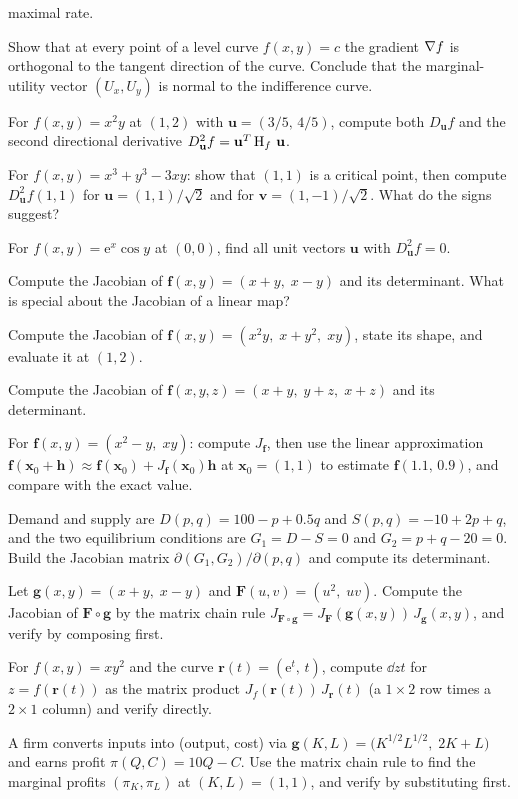 \begin{problems}
        maximal rate.
  \item Show that at every point of a level curve $f(x,y)=c$ the gradient
        $\nabla f$ is orthogonal to the tangent direction of the curve.
        Conclude that the marginal-utility vector $(U_{x},U_{y})$ is
        normal to the indifference curve.
  \item For $f(x,y)=x^{2}y$ at $(1,2)$ with $\mathbf{u}=(3/5,\,4/5)$,
        compute both $D_{\mathbf{u}}f$ and the second directional
        derivative
        $D^{2}_{\mathbf{u}}f=\mathbf{u}^{T}\operatorname{H}_{f}\,\mathbf{u}$.
  \item For $f(x,y)=x^{3}+y^{3}-3xy$: show that $(1,1)$ is a critical
        point, then compute $D^{2}_{\mathbf{u}}f(1,1)$ for
        $\mathbf{u}=(1,1)/\sqrt{2}$ and for
        $\mathbf{v}=(1,-1)/\sqrt{2}$. What do the signs suggest?
  \item For $f(x,y)=\mathrm{e}^{x}\cos y$ at $(0,0)$, find all unit
        vectors $\mathbf{u}$ with $D^{2}_{\mathbf{u}}f=0$.
  \item Compute the Jacobian of $\mathbf{f}(x,y)=(x+y,\;x-y)$ and its
        determinant. What is special about the Jacobian of a linear map?
  \item Compute the Jacobian of
        $\mathbf{f}(x,y)=(x^{2}y,\;x+y^{2},\;xy)$, state its shape, and
        evaluate it at $(1,2)$.
  \item Compute the Jacobian of
        $\mathbf{f}(x,y,z)=(x+y,\;y+z,\;x+z)$ and its determinant.
  \item For $\mathbf{f}(x,y)=(x^{2}-y,\;xy)$: compute $J_{\mathbf{f}}$,
        then use the linear approximation
        $\mathbf{f}(\mathbf{x}_{0}+\mathbf{h})\approx
        \mathbf{f}(\mathbf{x}_{0})+J_{\mathbf{f}}(\mathbf{x}_{0})\mathbf{h}$
        at $\mathbf{x}_{0}=(1,1)$ to estimate $\mathbf{f}(1.1,\,0.9)$,
        and compare with the exact value.
  \item Demand and supply are $D(p,q)=100-p+0.5q$ and
        $S(p,q)=-10+2p+q$, and the two equilibrium conditions are
        $G_{1}=D-S=0$ and $G_{2}=p+q-20=0$. Build the Jacobian matrix
        $\partial(G_{1},G_{2})/\partial(p,q)$ and compute its
        determinant.
  \item Let $\mathbf{g}(x,y)=(x+y,\;x-y)$ and
        $\mathbf{F}(u,v)=(u^{2},\;uv)$. Compute the Jacobian of
        $\mathbf{F}\circ\mathbf{g}$ by the matrix chain rule
        $J_{\mathbf{F}\circ\mathbf{g}}
        =J_{\mathbf{F}}(\mathbf{g}(x,y))\,J_{\mathbf{g}}(x,y)$, and
        verify by composing first.
  \item For $f(x,y)=xy^{2}$ and the curve
        $\mathbf{r}(t)=(\mathrm{e}^{t},\,t)$, compute $\dd{z}{t}$ for
        $z=f(\mathbf{r}(t))$ as the matrix product
        $J_{f}(\mathbf{r}(t))\,J_{\mathbf{r}}(t)$ (a $1\times2$ row
        times a $2\times1$ column) and verify directly.
  \item A firm converts inputs into (output, cost) via
        $\mathbf{g}(K,L)=\bigl(K^{1/2}L^{1/2},\;2K+L\bigr)$ and earns
        profit $\pi(Q,C)=10Q-C$. Use the matrix chain rule to find the
        marginal profits $(\pi_{K},\pi_{L})$ at $(K,L)=(1,1)$, and verify
        by substituting first.
\end{problems}

